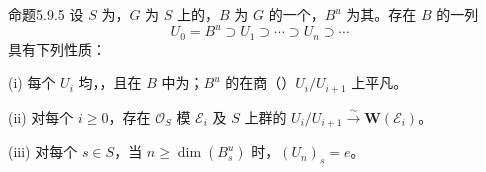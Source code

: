 \begin{SGAresult}{命题}{5.9.5}
设 $S$ 为，$G$ 为 $S$ 上的，$B$ 为 $G$ 的一个，$B^u$ 为其。存在 $B$ 的一列
\[U_0=B^u\supset U_1\supset\cdots\supset U_n\supset\cdots\]
具有下列性质：

(i) 每个 $U_i$ 均，，且在 $B$ 中为；$B^u$ 的在商（）$U_i/U_{i+1}$ 上平凡。

(ii) 对每个 $i\ge0$，存在 $\mathcal O_S$ 模 $\mathcal E_i$ 及 $S$ 上群的 $U_i/U_{i+1}\xrightarrow\sim\mathbf W(\mathcal E_i)$。

(iii) 对每个 $s\in S$，当 $n\ge\dim(B_s^u)$ 时，$(U_n)_s=e$。
\end{SGAresult}
